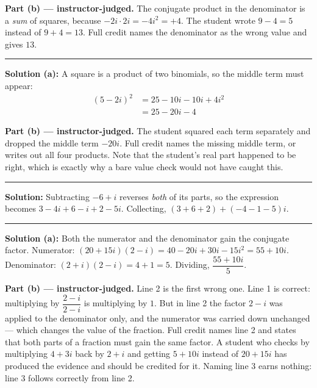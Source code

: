 \documentclass[12pt]{article}
\begin{document}
\textbf{Part (b) --- instructor-judged.} The conjugate product in the
denominator is a \emph{sum} of squares, because $-2i \cdot 2i = -4i^{2} = +4$.
The student wrote $9 - 4 = 5$ instead of $9 + 4 = 13$. Full credit names the
denominator as the wrong value and gives $13$.

\vspace{0.15cm}
\noindent\rule{\linewidth}{0.2pt}


\textbf{Solution (a):} A square is a product of two binomials, so the middle
term must appear:
\begin{align*}
  (5 - 2i)^{2} &= 25 - 10i - 10i + 4i^{2} \\
               &= 25 - 20i - 4
\end{align*}

\textbf{Part (b) --- instructor-judged.} The student squared each term
separately and dropped the middle term $-20i$. Full credit names the missing
middle term, or writes out all four products. Note that the student's real part
happened to be right, which is exactly why a bare value check would not have
caught this.

\vspace{0.15cm}
\noindent\rule{\linewidth}{0.2pt}


\textbf{Solution:} Subtracting $-6 + i$ reverses \emph{both} of its parts, so
the expression becomes $3 - 4i + 6 - i + 2 - 5i$. Collecting,
$(3 + 6 + 2) + (-4 - 1 - 5)i$. 

\vspace{0.15cm}
\noindent\rule{\linewidth}{0.2pt}


\textbf{Solution (a):} Both the numerator and the denominator gain the
conjugate factor. Numerator:
$(20 + 15i)(2 - i) = 40 - 20i + 30i - 15i^{2} = 55 + 10i$. Denominator:
$(2 + i)(2 - i) = 4 + 1 = 5$. Dividing, $\dfrac{55 + 10i}{5}$. 

\textbf{Part (b) --- instructor-judged.} Line 2 is the first wrong one. Line 1
is correct: multiplying by $\dfrac{2 - i}{2 - i}$ is multiplying by $1$. But in
line 2 the factor $2 - i$ was applied to the denominator only, and the numerator
was carried down unchanged --- which changes the value of the fraction. Full
credit names line 2 and states that both parts of a fraction must gain the same
factor. A student who checks by multiplying $4 + 3i$ back by $2 + i$ and getting
$5 + 10i$ instead of $20 + 15i$ has produced the evidence and should be credited
for it. Naming line 3 earns nothing: line 3 follows correctly from line 2.
\end{document}
